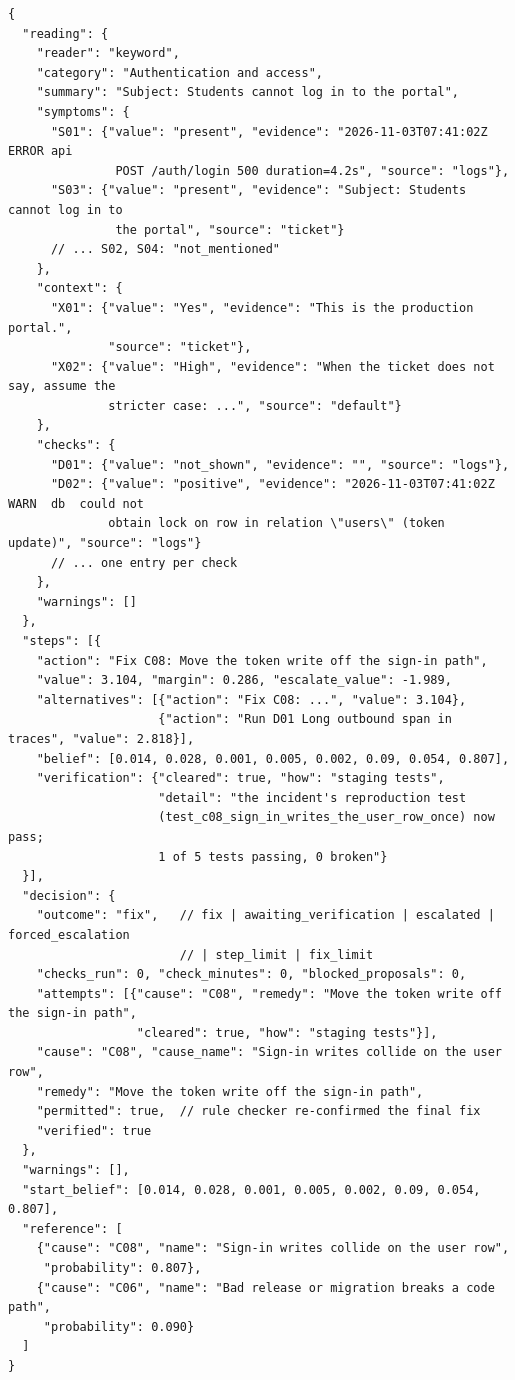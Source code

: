 \documentclass[11pt,a4paper]{article}
\newenvironment{codeblock}{\par\footnotesize}{\par}
\begin{document}
\begin{codeblock}
\begin{verbatim}
{
  "reading": {
    "reader": "keyword",
    "category": "Authentication and access",
    "summary": "Subject: Students cannot log in to the portal",
    "symptoms": {
      "S01": {"value": "present", "evidence": "2026-11-03T07:41:02Z ERROR api
               POST /auth/login 500 duration=4.2s", "source": "logs"},
      "S03": {"value": "present", "evidence": "Subject: Students cannot log in to
               the portal", "source": "ticket"}
      // ... S02, S04: "not_mentioned"
    },
    "context": {
      "X01": {"value": "Yes", "evidence": "This is the production portal.",
              "source": "ticket"},
      "X02": {"value": "High", "evidence": "When the ticket does not say, assume the
              stricter case: ...", "source": "default"}
    },
    "checks": {
      "D01": {"value": "not_shown", "evidence": "", "source": "logs"},
      "D02": {"value": "positive", "evidence": "2026-11-03T07:41:02Z WARN  db  could not
              obtain lock on row in relation \"users\" (token update)", "source": "logs"}
      // ... one entry per check
    },
    "warnings": []
  },
  "steps": [{
    "action": "Fix C08: Move the token write off the sign-in path",
    "value": 3.104, "margin": 0.286, "escalate_value": -1.989,
    "alternatives": [{"action": "Fix C08: ...", "value": 3.104},
                     {"action": "Run D01 Long outbound span in traces", "value": 2.818}],
    "belief": [0.014, 0.028, 0.001, 0.005, 0.002, 0.09, 0.054, 0.807],
    "verification": {"cleared": true, "how": "staging tests",
                     "detail": "the incident's reproduction test
                     (test_c08_sign_in_writes_the_user_row_once) now pass;
                     1 of 5 tests passing, 0 broken"}
  }],
  "decision": {
    "outcome": "fix",   // fix | awaiting_verification | escalated | forced_escalation
                        // | step_limit | fix_limit
    "checks_run": 0, "check_minutes": 0, "blocked_proposals": 0,
    "attempts": [{"cause": "C08", "remedy": "Move the token write off the sign-in path",
                  "cleared": true, "how": "staging tests"}],
    "cause": "C08", "cause_name": "Sign-in writes collide on the user row",
    "remedy": "Move the token write off the sign-in path",
    "permitted": true,  // rule checker re-confirmed the final fix
    "verified": true
  },
  "warnings": [],
  "start_belief": [0.014, 0.028, 0.001, 0.005, 0.002, 0.09, 0.054, 0.807],
  "reference": [
    {"cause": "C08", "name": "Sign-in writes collide on the user row",
     "probability": 0.807},
    {"cause": "C06", "name": "Bad release or migration breaks a code path",
     "probability": 0.090}
  ]
}
\end{verbatim}
\end{codeblock}
\end{document}
